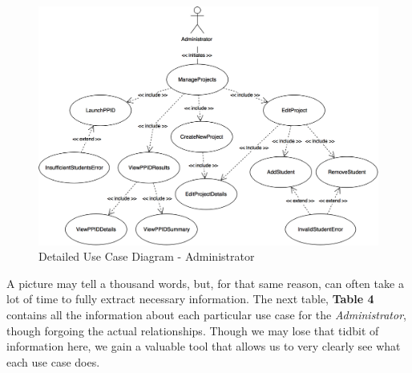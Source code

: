 \documentclass[12pt,letterpaper]{article}
\begin{document}
\begin{figure}[H]
	\centering{}
	\includegraphics[scale=0.26]{imgs/detailed-administrator-use-case-diagram.png}
	\caption{Detailed Use Case Diagram - Administrator}
\end{figure}

A picture may tell a thousand words, but, for that same reason, can often take a lot of time to fully extract necessary information. The next table, {\bf Table 4} contains 
all the information about each particular use case for the {\it Administrator}, though forgoing the actual relationships. Though we may lose that tidbit of information here, we gain a valuable 
tool that allows us to very clearly see what each use case does. 
\end{document}
